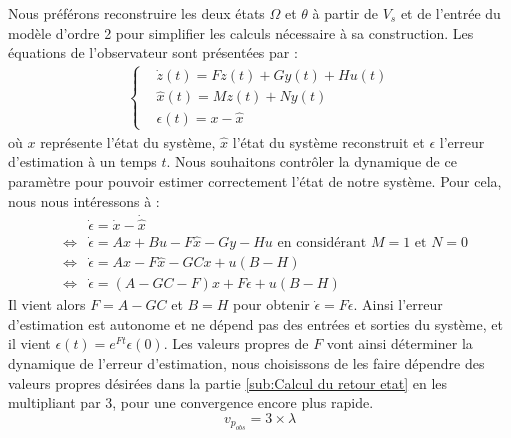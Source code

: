 Nous préférons reconstruire les deux états $\Omega$ et $\theta$ à partir de $V_s$ et de l'entrée du modèle d'ordre 2 pour simplifier les calculs nécessaire à sa construction. Les équations de l'observateur sont présentées par :
\begin{align*}
\left\lbrace
\begin{aligned}
&\dot z (t) = Fz(t) + Gy(t) + Hu(t)\\
&\hat x (t)= Mz(t) + Ny(t)\\
&\epsilon (t)= x-\hat{x}
\end{aligned}
\right.
\end{align*}
 où $x$ représente l'état du système, $\hat{x}$ l'état du système reconstruit et $\epsilon$ l'erreur d'estimation à un temps $t$. Nous souhaitons contrôler la dynamique de ce paramètre pour pouvoir estimer correctement l'état de notre système. Pour cela, nous nous intéressons à : 
\begin{eqnarray}
&&\dot{\epsilon} = \dot{x} - \dot{\hat{x}}\\
\label{equ:obs2}&\Leftrightarrow & \dot{\epsilon} = Ax +Bu - F\hat{x} - Gy - Hu \text{   en considérant }M=1 \text{ et } N = 0\\
& \Leftrightarrow & \dot{\epsilon} = Ax - F\hat{x} - GCx + u(B-H)\\
& \Leftrightarrow & \dot{\epsilon} = (A-GC-F)x + F\epsilon + u(B-H)
\end{eqnarray}
Il vient alors $F = A-GC$ et $B=H$ pour obtenir $\dot{\epsilon} = F\epsilon$. Ainsi l'erreur d'estimation est autonome et ne dépend pas des entrées et sorties du système, et il vient $\epsilon(t) = e^{Ft}\epsilon(0)$. Les valeurs propres de $F$ vont ainsi déterminer la dynamique de l'erreur d'estimation, nous choisissons de les faire dépendre des valeurs propres désirées dans la partie \ref{sub:Calcul du retour etat} en les multipliant par 3, pour une convergence encore plus rapide. 
\begin{equation}\label{eqn:vpObservateur}
v_{p_{obs}} = 3\times \lambda
\end{equation}

